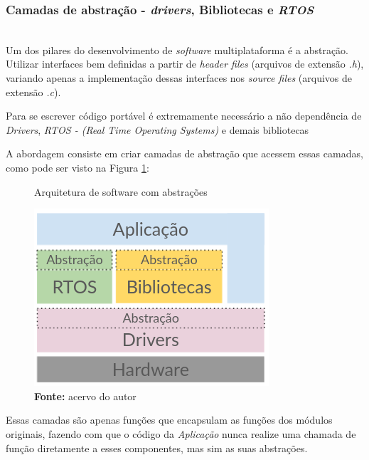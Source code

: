 \documentclass[times, twoside, watermark]{artigo}
\begin{document}
\subsubsection{Camadas de abstração - \textit{drivers}, Bibliotecas e \textit{RTOS}}\hfill\\

Um dos pilares do desenvolvimento de \textit{software} multiplataforma é a abstração.
Utilizar interfaces bem definidas a partir de \textit{header files} (arquivos de 
extensão \textit{.h}), variando apenas a implementação dessas interfaces nos 
\textit{source files} (arquivos de extensão \textit{.c}).

Para se escrever código portável é extremamente necessário a não dependência de 
\textit{Drivers}, \textit{RTOS - (Real Time Operating Systems)} e demais bibliotecas

A abordagem consiste em criar camadas de abstração que acessem essas camadas, como 
pode ser visto na Figura \ref{fig:arch-abs}:\hfill\\

\begin{figure}[H]
    \centering
    \caption{Arquitetura de software com abstrações}
    \includegraphics[width=0.9\linewidth]{images/arch-abs.png}
    \caption*{\newline\textbf{Fonte:} acervo do autor}
    \label{fig:arch-abs}
\end{figure}


Essas camadas são apenas funções que encapsulam as funções dos módulos originais, 
fazendo com que o código da \textit{Aplicação} nunca realize uma chamada de função 
diretamente a esses componentes, mas sim as suas abstrações.
\end{document}
